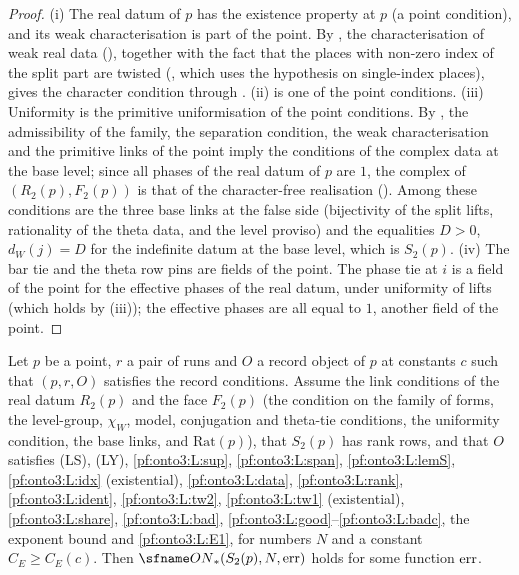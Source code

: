 \begin{proof}
(i) The real datum of $p$ has the existence property at $p$ (a point condition), and its weak characterisation is part of
the point. By , the characterisation of weak real
data (), together with the fact that the places with
non-zero index of the split part are twisted (, which uses
the hypothesis on single-index places), gives the character condition through
. (ii) is one of the point conditions.
(iii) Uniformity is the primitive uniformisation of the point conditions. By
, the admissibility of the family, the
separation condition, the weak characterisation and the primitive links of the point imply the conditions of the complex
data at the base level; since all phases of the real datum of $p$ are $1$, the complex of $(R_2(p),F_2(p))$ is that of the
character-free realisation (). Among these conditions are the three base
links at the false side (bijectivity of the split lifts, rationality of the theta data, and the level proviso) and the
equalities $D>0$, $d_W(j)=D$ for the indefinite datum at the base level, which is $S_2(p)$.
(iv) The bar tie and the theta row pins are fields of the point. The phase tie at $i$ is a field of the point for the
effective phases of the real datum, under uniformity of lifts (which holds by (iii)); the effective phases are all equal to
$1$, another field of the point.
\end{proof}

\begin{proposition}\label{pf:onto3:chain}
Let $p$ be a point, $r$ a pair of runs and $O$ a record object of $p$ at constants $c$ such that $(p,r,O)$ satisfies
the record conditions. Assume the link conditions of the real datum $R_2(p)$ and the face $F_2(p)$ (the condition on
the family of forms, the level-group, $\chi_W$, model, conjugation and theta-tie conditions, the uniformity
condition, the base links, and $\mathrm{Rat}(p)$), that $S_2(p)$ has rank rows, and that $O$ satisfies (LS), (LY),
\ref{pf:onto3:L:sup}, \ref{pf:onto3:L:span}, \ref{pf:onto3:L:lemS}, \ref{pf:onto3:L:idx} (existential),
\ref{pf:onto3:L:data}, \ref{pf:onto3:L:rank}, \ref{pf:onto3:L:ident}, \ref{pf:onto3:L:tw2}, \ref{pf:onto3:L:tw1}
(existential), \ref{pf:onto3:L:share}, \ref{pf:onto3:L:bad}, \ref{pf:onto3:L:good}--\ref{pf:onto3:L:badc}, the
exponent bound and \ref{pf:onto3:L:E1}, for numbers $N$ and a constant $C_E\ge C_E(c)$. Then
$\ontothreeONw(S_2(p),N,\ontothreeerr)$ holds for some function $\mathrm{err}$.
\end{proposition}

